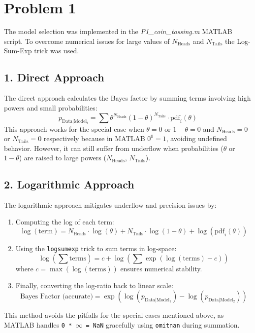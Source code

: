 \documentclass{article}
\begin{document}



\section*{Problem 1}

The model selection was implemented in the \textit{P1\_coin\_tossing.m} MATLAB script. 
To overcome numerical issues for large values of \(N_{\text{Heads}}\) and \(N_{\text{Tails}}\) the Log-Sum-Exp trick was used.


\subsection*{1. Direct Approach}
The direct approach calculates the Bayes factor by summing terms involving high powers and small probabilities:
\[
p_{\text{Data}|\text{Model}_i} = \sum \theta^{N_{\text{Heads}}} (1-\theta)^{N_{\text{Tails}}} \cdot \text{pdf}_i(\theta)
\]
This approach works for the special case when $\theta = 0$ or $1-\theta = 0 $ and $N_{\text{Heads}}=0$ or $N_{\text{Tails}}=0$ respectively because in MATLAB  $0 ^ 0 = 1$, avoiding undefined behavior. However, it can still suffer from underflow when probabilities (\(\theta\) or \(1-\theta\)) are raised to large powers (\(N_{\text{Heads}}\), \(N_{\text{Tails}}\)).

\subsection*{2. Logarithmic Approach}
The logarithmic approach mitigates underflow and precision issues by:
\begin{enumerate}
    \item Computing the log of each term:
    \[
    \log(\text{term}) = N_{\text{Heads}} \cdot \log(\theta) + N_{\text{Tails}} \cdot \log(1-\theta) + \log(\text{pdf}_i(\theta))
    \]
    \item Using the \texttt{logsumexp} trick to sum terms in log-space:
    \[
    \log\left(\sum \text{terms}\right) = c + \log\left(\sum \exp\left(\log(\text{terms}) - c\right)\right)
    \]
    where \(c = \max(\log(\text{terms}))\) ensures numerical stability.
    \item Finally, converting the log-ratio back to linear scale:
    \[
    \text{Bayes Factor (accurate)} = \exp\left(\log(p_{\text{Data}|\text{Model}_1}) - \log(p_{\text{Data}|\text{Model}_2})\right)
    \]
\end{enumerate}

This method avoids the pitfalls for the special cases mentioned above, as MATLAB handles \texttt{0 * \(\infty\) = NaN} gracefully using \texttt{omitnan} during summation.
\end{document}
